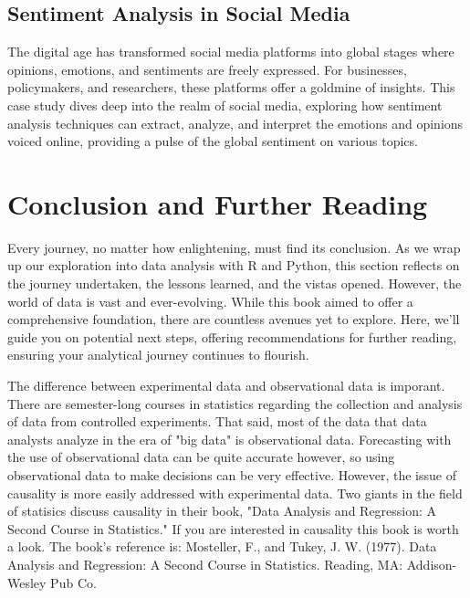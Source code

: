 \documentclass[a4paper,12pt]{book}
\begin{document}
\section{Sentiment Analysis in Social Media}
The digital age has transformed social media platforms into global stages where opinions, emotions, and sentiments are freely expressed. For businesses, policymakers, and researchers, these platforms offer a goldmine of insights. This case study dives deep into the realm of social media, exploring how sentiment analysis techniques can extract, analyze, and interpret the emotions and opinions voiced online, providing a pulse of the global sentiment on various topics.

\chapter*{Conclusion and Further Reading}
Every journey, no matter how enlightening, must find its conclusion. As we wrap up our exploration into data analysis with R and Python, this section reflects on the journey undertaken, the lessons learned, and the vistas opened. However, the world of data is vast and ever-evolving. While this book aimed to offer a comprehensive foundation, there are countless avenues yet to explore. Here, we'll guide you on potential next steps, offering recommendations for further reading, ensuring your analytical journey continues to flourish.

The difference between experimental data and observational data is imporant. There are semester-long courses in statistics regarding the collection and analysis of data from controlled experiments. That said, most of the data that data analysts analyze in the era of "big data" is observational data. Forecasting with the use of observational data can be quite accurate however, so using observational data to make decisions can be very effective. However, the issue of causality is more easily addressed with experimental data. Two giants in the field of statisics discuss causality in their book, "Data Analysis and Regression: A Second Course in Statistics." If you are interested in causality this book is worth a look. The book's reference is: Mosteller, F., and Tukey, J. W. (1977). Data Analysis and Regression: A Second Course in Statistics. Reading, MA: Addison-Wesley Pub Co.

\clearpage
{}
\appendix
\renewcommand{\thechapter}{\Roman{chapter}} %
\end{document}
